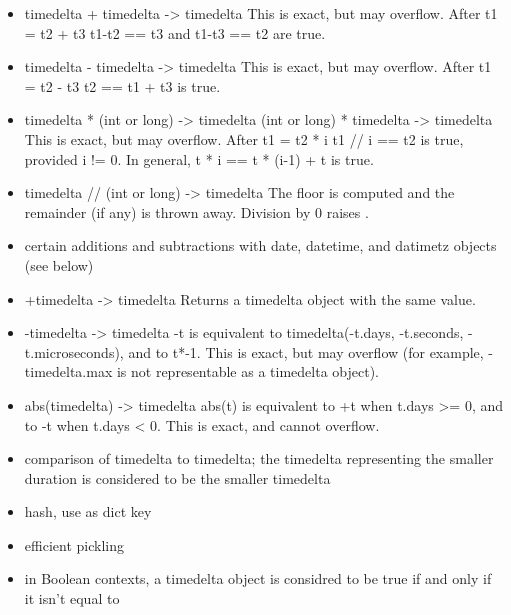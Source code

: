 \begin{itemize}
  \item
    timedelta + timedelta -> timedelta
    This is exact, but may overflow.  After
        t1 = t2 + t3
    t1-t2 == t3 and t1-t3 == t2 are true.

  \item
    timedelta - timedelta -> timedelta
    This is exact, but may overflow.  After
        t1 = t2 - t3
     t2 == t1 + t3 is true.

  \item
    timedelta * (int or long) -> timedelta
    (int or long) * timedelta -> timedelta
    This is exact, but may overflow.  After
        t1 = t2 * i
    t1 // i == t2 is true, provided i != 0.  In general,
        t * i == t * (i-1) + t
    is true.

  \item
    timedelta // (int or long) -> timedelta
    The floor is computed and the remainder (if any) is thrown away.
    Division by 0 raises .

  \item
    certain additions and subtractions with date, datetime, and datimetz
    objects (see below)

  \item
    +timedelta -> timedelta
    Returns a timedelta object with the same value.

  \item
    -timedelta -> timedelta
    -t is equivalent to timedelta(-t.days, -t.seconds, -t.microseconds),
    and to t*-1.  This is exact, but may overflow (for example,
    -timedelta.max is not representable as a timedelta object).

  \item
    abs(timedelta) -> timedelta
    abs(t) is equivalent to +t when t.days >= 0, and to -t when
    t.days < 0.  This is exact, and cannot overflow.

  \item
    comparison of timedelta to timedelta; the timedelta representing
    the smaller duration is considered to be the smaller timedelta

  \item
    hash, use as dict key

  \item
    efficient pickling

  \item
    in Boolean contexts, a timedelta object is considred to be true
    if and only if it isn't equal to 
\end{itemize}


